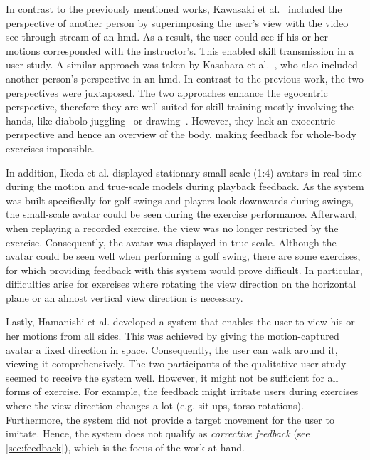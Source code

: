 In contrast to the previously mentioned works, Kawasaki et al.~\cite{kawasaki2010cst} included the perspective of another person by superimposing the user's view with the video see-through stream of an \acrshort{hmd}. As a result, the user could see if his or her motions corresponded with the instructor's. This enabled skill transmission in a user study. A similar approach was taken by Kasahara et al.~\cite{kasahara2016pe}, who also included another person's perspective in an \acrshort{hmd}. In contrast to the previous work, the two perspectives were juxtaposed. The two approaches enhance the egocentric perspective, therefore they are well suited for skill training mostly involving the hands, like diabolo juggling~\cite{kawasaki2010cst} or drawing~\cite{kasahara2016pe}. However, they lack an exocentric perspective and hence an overview of the body, making feedback for whole-body exercises impossible.



In addition, Ikeda et al. \cite{ikeda2018arb} displayed stationary small-scale (1:4) avatars in real-time during the motion and true-scale models during playback feedback. As the system was built specifically for golf swings and players look downwards during swings, the small-scale avatar could be seen during the exercise performance. Afterward, when replaying a recorded exercise, the view was no longer restricted by the exercise. Consequently, the avatar was displayed in true-scale. Although the avatar could be seen well when performing a golf swing, there are some exercises, for which providing feedback with this system would prove difficult. In particular, difficulties arise for exercises where rotating the view direction on the horizontal plane or an almost vertical view direction is necessary.

Lastly, Hamanishi et al. \cite{Hamanishi2019avu} developed a system that enables the user to view his or her motions from all sides. This was achieved by giving the motion-captured avatar a fixed direction in space. Consequently, the user can walk around it, viewing it comprehensively. The two participants of the qualitative user study seemed to receive the system well. However, it might not be sufficient for all forms of exercise. For example, the feedback might irritate users during exercises where the view direction changes a lot (e.g. sit-ups, torso rotations). Furthermore, the system did not provide a target movement for the user to imitate. Hence, the system does not qualify as \emph{corrective feedback} (see \autoref{sec:feedback}), which is the focus of the work at hand.

